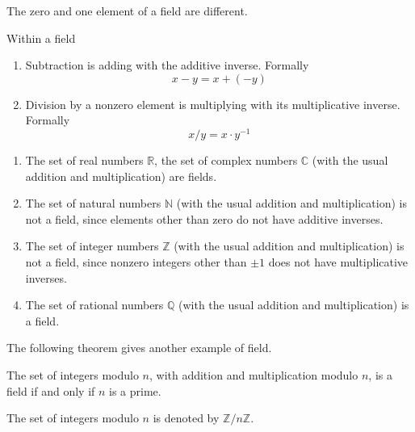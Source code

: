 \begin{note}
    The zero and one element of a field are different.
\end{note}

\begin{definition}
    Within a field
    \begin{enumerate}
        \item Subtraction is adding with the additive inverse. Formally
            \[
                x - y = x + (-y)
            \]
        \item Division by a nonzero element is multiplying with its multiplicative inverse. Formally
            \[
                x / y = x\cdot y^{-1}
            \]
    \end{enumerate}
\end{definition}

\begin{example}
    \begin{enumerate}[label = (\alph*)]
        \item The set of real numbers $\mathbb{R}$, the set of complex numbers $\mathbb{C}$ (with the usual addition and multiplication) are fields.
        \item The set of natural numbers $\mathbb{N}$ (with the usual addition and multiplication) is not a field, since elements other than zero do not have additive inverses.
        \item The set of integer numbers $\mathbb{Z}$ (with the usual addition and multiplication) is not a field, since nonzero integers other than $\pm 1$ does not have multiplicative inverses.
        \item The set of rational numbers $\mathbb{Q}$ (with the usual addition and multiplication) is a field.
    \end{enumerate}
\end{example}

\bigskip
The following theorem gives another example of field.

\begin{theorem}
    The set of integers modulo $n$, with addition and multiplication modulo $n$, is a field if and only if $n$ is a prime.
\end{theorem}

The set of integers modulo $n$ is denoted by $\mathbb{Z}/n\mathbb{Z}$.

